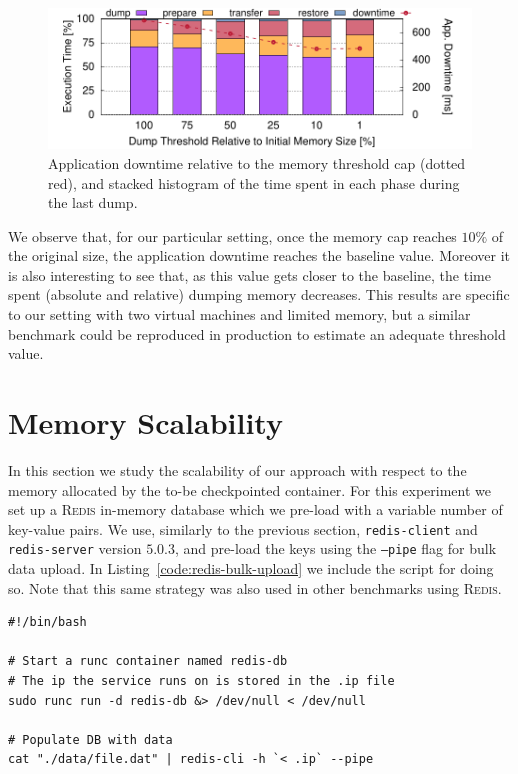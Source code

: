 \begin{figure}[h!]
    \centering
    \includegraphics[width=\textwidth]{./figs/downtime/downtime.pdf}
    \caption[Application Downtime Relative to Threshold]{Application downtime relative to the memory threshold cap (dotted red), and stacked histogram of the time spent in each phase during the last dump.\label{fig:downtime}}
\end{figure}

We observe that, for our particular setting, once the memory cap reaches $10\%$ of the original size, the application downtime reaches the baseline value.
Moreover it is also interesting to see that, as this value gets closer to the baseline, the time spent (absolute and relative) dumping memory decreases.
This results are specific to our setting with two virtual machines and limited memory, but a similar benchmark could be reproduced in production to estimate an adequate threshold value.

\section{Memory Scalability} \label{sec:eval-memory}

In this section we study the scalability of our approach with respect to the memory allocated by the to-be checkpointed container.
For this experiment we set up a \textsc{Redis} in-memory database which we pre-load with a variable number of key-value pairs.
We use, similarly to the previous section, \texttt{redis-client} and \texttt{redis-server} version $5.0.3$, and pre-load the keys using the \texttt{--pipe} flag for bulk data upload.
In Listing~\ref{code:redis-bulk-upload} we include the script for doing so.
Note that this same strategy was also used in other benchmarks using \textsc{Redis}.
\begin{lstlisting}[style=Bash,caption={Snippet for bulk data upload to a Redis database.},label={code:redis-bulk-upload}]
#!/bin/bash

# Start a runc container named redis-db
# The ip the service runs on is stored in the .ip file
sudo runc run -d redis-db &> /dev/null < /dev/null

# Populate DB with data
cat "./data/file.dat" | redis-cli -h `< .ip` --pipe
\end{lstlisting}

